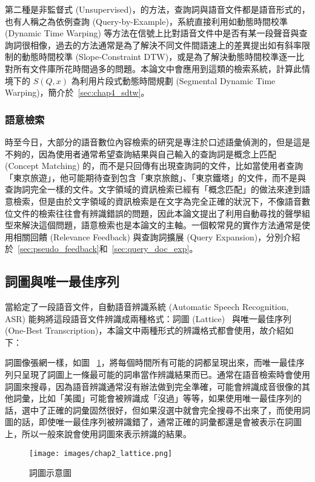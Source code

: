 第二種是非監督式 (Unsupervised)，的方法，查詢詞與語音文件都是語音形式的，也有人稱之為依例查詢 (Query-by-Example)，系統直接利用如動態時間校準 (Dynamic Time Warping) 等方法在信號上比對語音文件中是否有某一段聲音與查詢詞很相像，過去的方法通常是為了解決不同文件間語速上的差異提出如有斜率限制的動態時間校準 (Slope-Constraint DTW)，或是為了解決動態時間校準逐一比對所有文件庫所花時間過多的問題。本論文中會應用到這類的檢索系統，計算此情境下的 $S(Q, x)$ 為利用片段式動態時間規劃 (Segmental Dynamic Time Warping)，簡介於~\ref{sec:chap4_sdtw}。

\subsubsection{語意檢索}
時至今日，大部分的語音數位內容檢索的研究是專注於口述語彙偵測的，但是這是不夠的，因為使用者通常希望查詢結果與自己輸入的查詢詞是概念上匹配 (Concept Matching) 的，而不是只回傳有出現查詢詞的文件，比如當使用者查詢「東京旅遊」，他可能期待查到包含「東京旅館」、「東京鐵塔」的文件，而不是與查詢詞完全一樣的文件。文字領域的資訊檢索已經有「概念匹配」的做法來達到語意檢索，但是由於文字領域的資訊檢索是在文字為完全正確的狀況下，不像語音數位文件的檢索往往會有辨識錯誤的問題，因此本論文提出了利用自動尋找的聲學組型來解決這個問題，語意檢索也是本論文的主軸。一個較常見的實作方法通常是使用相關回饋 (Relevance Feedback) 與查詢詞擴展 (Query Expansion)，分別介紹於~\ref{sec:pseudo_feedback}和~\ref{sec:query_doc_exp}。

\subsection{詞圖與唯一最佳序列}
當給定了一段語音文件，自動語音辨識系統 (Automatic Speech Recognition, ASR) 能夠將這段語音文件辨識成兩種格式：詞圖 (Lattice)~\cite{saraclar51lattice} 與唯一最佳序列 (One-Best Transcription)，本論文中兩種形式的辨識格式都會使用，故介紹如下：

詞圖像張網一樣，如圖 ~\ref{fig:chap2_lattice}，將每個時間所有可能的詞都呈現出來，而唯一最佳序列只呈現了詞圖上一條最可能的詞串當作辨識結果而已。通常在語音檢索時會使用詞圖來搜尋，因為語音辨識通常沒有辦法做到完全準確，可能會辨識成音很像的其他詞彙，比如「美國」可能會被辨識成「沒過」等等，如果使用唯一最佳序列的話，選中了正確的詞彙固然很好，但如果沒選中就會完全搜尋不出來了，而使用詞圖的話，即使唯一最佳序列被辨識錯了，通常正確的詞彙都還是會被表示在詞圖上，所以一般來說會使用詞圖來表示辨識的結果。

\begin{figure}
\centering
\texttt{[image: images/chap2\_lattice.png]}
\caption{詞圖示意圖} \label{fig:chap2_lattice}
\end{figure}

